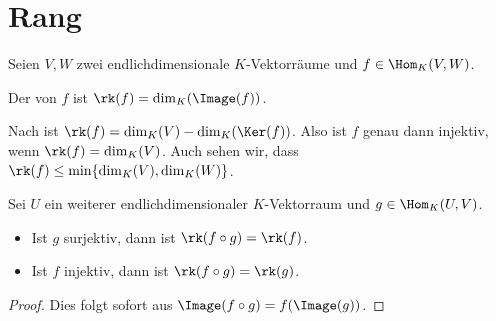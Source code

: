 \section{Rang}

Seien $V,W$ zwei endlichdimensionale $K$-Vektorräume und $f\in \Hom_K(V,W)$.

\begin{definition}[Rang]
	Der  von $f$ ist $\rk(f)=\dim_K(\Image(f))$.
\end{definition}

\begin{remark}
	Nach  ist $\rk(f)=\dim_K(V)-\dim_K(\Ker(f))$. Also ist $f$ genau dann injektiv, wenn $\rk(f)=\dim_K(V)$. Auch sehen wir, 
	dass $\rk(f)\le \min\{\dim_K(V),\dim_K(W)\}$.
\end{remark}

\begin{lemma}
	Sei $U$ ein weiterer endlichdimensionaler $K$-Vektorraum und $g\in \Hom_K(U,V)$.
	\begin{itemize}
		\item Ist $g$ surjektiv, dann ist $\rk(f\circ g)=\rk(f)$.
		\item Ist $f$ injektiv, dann ist $\rk(f\circ g)=\rk(g)$.
	\end{itemize}
\end{lemma}
\begin{proof}
	Dies folgt sofort aus $\Image(f\circ g)=f(\Image(g))$.
\end{proof}

